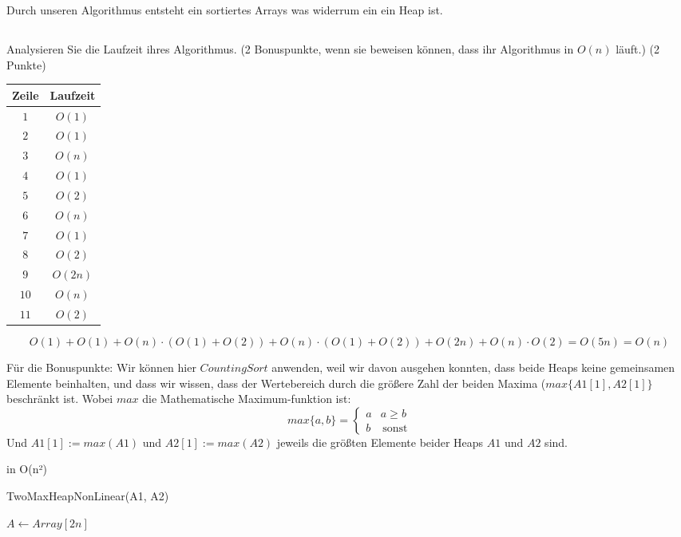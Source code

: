 \documentclass[11pt]{article}
\theoremstyle{remark}
\newcommand*{\CommentInLine}{\tcc*[f]}
\begin{document}
Durch unseren Algorithmus entsteht ein sortiertes Arrays was widerrum ein ein Heap ist.

\subsection{}
Analysieren Sie die Laufzeit ihres Algorithmus. (2 Bonuspunkte, wenn sie beweisen
können, dass ihr Algorithmus in $O(n)$ läuft.) (2 Punkte)\\

\begin{tabular}{|c|c|} \hline
    Zeile & Laufzeit \\ \hline
    $1$ & $O(1)$ \\  \hline
    $2$ & $O(1)$ \\ \hline
    $3$ & $O(n)$ \\ \hline
    $4$ & $O(1)$ \\ \hline
    $5$ & $O(2)$\\ \hline
    $6$ & $O(n)$ \\ \hline
    $7$ & $O(1)$ \\ \hline
    $8$ & $O(2)$ \\ \hline
    $9$ & $O(2n)$ \\ \hline
    $10$ & $O(n)$ \\ \hline
    $11$ & $O(2)$ \\ \hline
\end{tabular}

\[
O(1) + O(1) + O(n) \cdot (O(1) + O(2)) + O(n) \cdot (O(1) + O(2)) + O(2n) + O(n) \cdot O(2) = O(5n) = O(n)
\]

Für die Bonuspunkte: Wir können hier $CountingSort$ anwenden, weil wir davon ausgehen konnten, dass beide Heaps keine gemeinsamen Elemente beinhalten, und dass wir wissen, dass der Wertebereich durch die größere Zahl der beiden Maxima ($max\{A1[1], A2[1]\}$ beschränkt ist. Wobei $max$ die Mathematische Maximum-funktion ist:
$$max\{a,b\} = \begin{cases}
a & a \geq b \\
b & \, \text{sonst}
\end{cases}$$
Und $A1\left[1\right] := max(A1)$ und $A2\left[1\right] := max(A2)$ jeweils die größten Elemente beider Heaps $A1$ und $A2$ sind.

 in O(n²)
 \begin{algorithm}
 \caption{TwoMaxHeapNonLinear(A1, A2)}
     $A \gets Array[2n] \quad $\CommentInLine{Neues Array der Größe $2n$} \\
 \end{algorithm}
\end{document}
